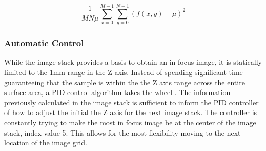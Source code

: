\documentclass[a4paper,12pt]{article}
\begin{document}
$$\frac{1}{MN\mu} \sum\limits_{x=0}^{M-1} \sum\limits_{y=0}^{N-1}(f(x,y) - \mu)^2$$

\subsubsection{Automatic Control}
While the image stack provides a basis to obtain an in focus image, it is statically limited to the 1mm range in the Z axis. Instead of spending significant time guaranteeing that the sample
is within the the Z axis range across the entire surface area, a PID control algorithm takes the wheel \citep{odwyer_summary_2000}. The information previously calculated in the image stack is sufficient 
to inform the PID controller of how to adjust the initial the Z axis for the next image stack. The controller is constantly trying to make the most in focus image be at the center of the image stack,
index value 5. This allows for the most flexibility moving to the next location of the image grid. 
\end{document}
